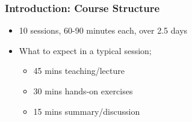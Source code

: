 \documentclass{beamer}
\begin{document}
\begin{frame}
\frametitle{\bf Introduction: Course Structure}
\begin{itemize}
\item 10 sessions, 60-90 minutes each, over 2.5 days
\item What to expect in a typical session;
\begin{itemize} 
\item 45 mins teaching/lecture 
\item 30 mins hands-on exercises
\item 15 mins summary/discussion
\end{itemize}
\end{itemize}
\end{frame}
\end{document}
